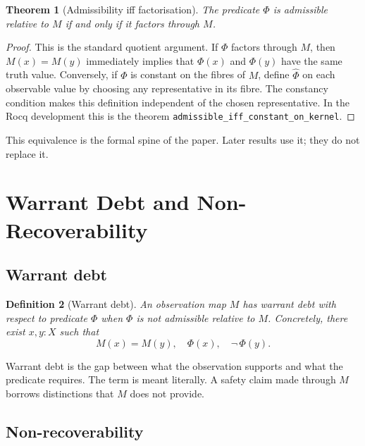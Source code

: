 \documentclass[a4paper,11pt]{article}
\newtheorem{theorem}{Theorem}[section]
\newtheorem{definition}[theorem]{Definition}
\begin{document}
\begin{theorem}[Admissibility iff factorisation]
\label{thm:backbone}
The predicate \(\Phi\) is admissible relative to \(M\) if and only if it
factors through \(M\).
\end{theorem}

\begin{proof}
This is the standard quotient argument. If \(\Phi\) factors through \(M\), then
\(M(x)=M(y)\) immediately implies that \(\Phi(x)\) and \(\Phi(y)\) have the same
truth value. Conversely, if \(\Phi\) is constant on the fibres of \(M\), define
\(\widehat{\Phi}\) on each observable value by choosing any representative in its
fibre. The constancy condition makes this definition independent of the chosen
representative. In the Rocq development this is the theorem
\texttt{admissible\_iff\_constant\_on\_kernel}.
\end{proof}

This equivalence is the formal spine of the paper. Later results use it; they do
not replace it.

\section{Warrant Debt and Non-Recoverability}
\label{sec:warrant}

\subsection{Warrant debt}

\begin{definition}[Warrant debt]
\label{def:debt}
An observation map \(M\) has \emph{warrant debt} with respect to predicate
\(\Phi\) when \(\Phi\) is not admissible relative to \(M\). Concretely, there
exist \(x, y : X\) such that
\[
  M(x) = M(y),\quad \Phi(x),\quad \neg\,\Phi(y).
\]
\end{definition}

Warrant debt is the gap between what the observation supports and what the
predicate requires. The term is meant literally. A safety claim made through
\(M\) borrows distinctions that \(M\) does not provide.

\subsection{Non-recoverability}
\end{document}
